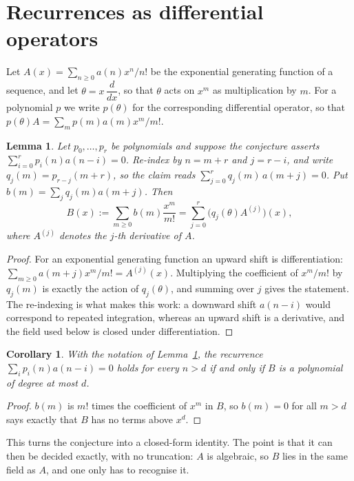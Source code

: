 \documentclass[11pt,a4paper]{article}
\theoremstyle{plain}
\newtheorem{lemma}[theorem]{Lemma}
\newtheorem{corollary}[theorem]{Corollary}
\theoremstyle{definition}
\begin{document}
\section{Recurrences as differential operators}

Let $A(x)=\sum_{n\ge0}a(n)x^{n}/n!$ be the exponential generating function of a sequence, and let
$\theta=x\,\dfrac{d}{dx}$, so that $\theta$ acts on $x^{m}$ as multiplication by $m$. For a
polynomial $p$ we write $p(\theta)$ for the corresponding differential operator, so that
$p(\theta)A=\sum_{m}p(m)a(m)x^{m}/m!$.

\begin{lemma}\label{lem:transfer}
Let $p_{0},\dots,p_{r}$ be polynomials and suppose the conjecture asserts
$\sum_{i=0}^{r}p_{i}(n)a(n-i)=0$. Re-index by $n=m+r$ and $j=r-i$, and write
$q_{j}(m)=p_{r-j}(m+r)$, so the claim reads $\sum_{j=0}^{r}q_{j}(m)\,a(m+j)=0$. Put
$b(m)=\sum_{j}q_{j}(m)a(m+j)$. Then
\[
B(x):=\sum_{m\ge0}b(m)\frac{x^{m}}{m!}=\sum_{j=0}^{r}\bigl(q_{j}(\theta)A^{(j)}\bigr)(x),
\]
where $A^{(j)}$ denotes the $j$-th derivative of $A$.
\end{lemma}

\begin{proof}
For an exponential generating function an upward shift is differentiation:
$\sum_{m\ge0}a(m+j)x^{m}/m!=A^{(j)}(x)$. Multiplying the coefficient of $x^{m}/m!$ by
$q_{j}(m)$ is exactly the action of $q_{j}(\theta)$, and summing over $j$ gives the
statement. The re-indexing is what makes this work: a downward shift $a(n-i)$ would
correspond to repeated integration, whereas an upward shift is a derivative, and the
field used below is closed under differentiation.
\end{proof}

\begin{corollary}\label{cor:criterion}
With the notation of Lemma~\ref{lem:transfer}, the recurrence
$\sum_{i}p_{i}(n)a(n-i)=0$ holds for every $n>d$ if and only if $B$ is a polynomial of
degree at most $d$.
\end{corollary}

\begin{proof}
$b(m)$ is $m!$ times the coefficient of $x^{m}$ in $B$, so $b(m)=0$ for all $m>d$ says
exactly that $B$ has no terms above $x^{d}$.
\end{proof}

This turns the conjecture into a closed-form identity. The point is that it can then be
decided exactly, with no truncation: $A$ is algebraic, so $B$ lies in the same field as
$A$, and one only has to recognise it.
\end{document}
